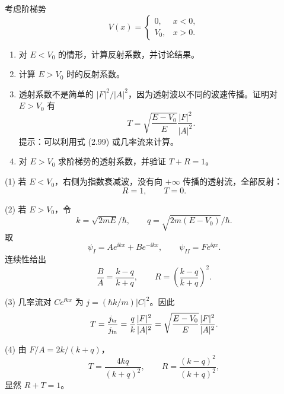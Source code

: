 \begin{question}
考虑阶梯势
\[
V(x)=\begin{cases}0,&x<0,\\ V_0,&x>0.
\end{cases}
\]
\begin{enumerate}
\item 对 $E<V_0$ 的情形，计算反射系数，并讨论结果。
\item 计算 $E>V_0$ 时的反射系数。
\item 透射系数不是简单的 $|F|^2/|A|^2$，因为透射波以不同的波速传播。证明对 $E>V_0$ 有
\[
T=\sqrt{\frac{E-V_0}{E}}\frac{|F|^2}{|A|^2}.
\]
提示：可以利用式 (2.99) 或几率流来计算。
\item 对 $E>V_0$ 求阶梯势的透射系数，并验证 $T+R=1$。
\end{enumerate}

\par\smallskip
{}

\end{question}
\begin{solution}
(1) 若 $E<V_0$，右侧为指数衰减波，没有向 $+\infty$ 传播的透射流，全部反射：
\[
R=1,
\qquad T=0.
\]

(2) 若 $E>V_0$，令
\[
k=\sqrt{2mE}/\hbar,
\qquad
q=\sqrt{2m(E-V_0)}/\hbar.
\]
取
\[
\psi_I=Ae^{\ii kx}+Be^{-\ii kx},
\qquad
\psi_{II}=Fe^{\ii qx}.
\]
连续性给出
\[
\frac BA=\frac{k-q}{k+q},
\qquad
R=\left(\frac{k-q}{k+q}\right)^2.
\]

(3) 几率流对 $Ce^{\ii kx}$ 为 $j=(\hbar k/m)|C|^2$。因此
\[
T=\frac{j_{\rm tr}}{j_{\rm in}}
=\frac{q}{k}\frac{|F|^2}{|A|^2}
=\sqrt{\frac{E-V_0}{E}}\frac{|F|^2}{|A|^2}.
\]

(4) 由 $F/A=2k/(k+q)$，
\[
T=\frac{4kq}{(k+q)^2},
\qquad
R=\frac{(k-q)^2}{(k+q)^2},
\]
显然 $R+T=1$。
\end{solution}

